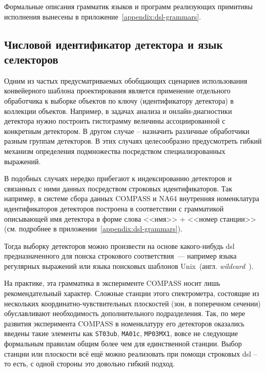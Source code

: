 Формальные описания грамматик языков и программ реализующих
примитивы исполнения вынесены в приложение~\ref{appendix:dsl-grammars}.

\subsection{Числовой идентификатор детектора и язык селекторов}

Одним из частых предусматриваемых обобщающих сценариев использования
конвейерного шаблона проектирования является применение отдельного
обработчика к выборке объектов по ключу (идентификатору детектора)
в коллекции объектов. Например, в задачах анализа и
онлайн-диагностики детектора
нужно построить гистограмму величины ассоциированной с конкретным
детектором. В другом случае -- назначить различные обработчики
разным группам детекторов. В этих случаях целесообразно предусмотреть гибкий
механизм определения подмножества посредством специализрованных
выражений.

В подобных случаях нередко прибегают к индексированию детекторов и связанных
с ними данных посредством строковых идентификаторов. Так например, в системе
сбора данных COMPASS и NA64 внутренняя номенклатура идентификаторов детекторов
построена в соответствии с грамматикой описывающей имя детектора
в форме слова <<имя>> + <<номер станции>> (см. подробнее в приложении~\ref{appendix:dsl-grammars}).

Тогда выборку детекторов можно произвести на основе
какого-нибудь \acrshort{dsl} предназначенного для поиска строкового
соответствия~--- например языка регулярных выражений или
языка поисковых шаблонов Unix~(англ. \emph{wildcard}~\cite{wildcards-mcilroy1987research}).

На практике, эта грамматика в эксперименте COMPASS носит лишь
рекомендательный характер. Сложные станции этого спектрометра, состоящие из
нескольких координатно-чувствительных плоскостей (зон, в поперечном
сечении) обуславливают необходимость дополнительного подразделения. Так, по мере
развития эксперимента COMPASS в номенклатуру его детекторов
оказались введены такие элементы как \texttt{ST03ub}, \texttt{MA01c},
\texttt{MP03MX1}, вовсе не следующие формальным правилам общим более чем
для единственной станции. Выбор станции или плоскости всё ещё можно
реализовать при помощи строковых \acrshort{dsl} -- то есть, с одной стороны это
довольно гибкий подход.

